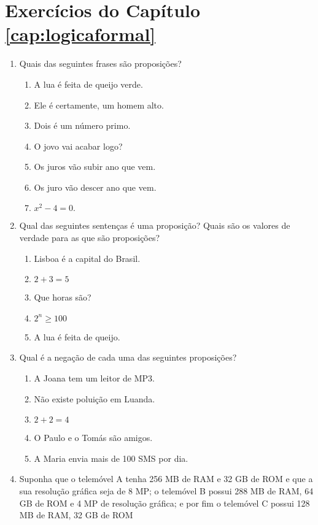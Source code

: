 \chapter*{Exercícios do Capítulo \ref{cap:logicaformal}}

\begin{enumerate}
  	\item Quais das seguintes frases são proposições?
  	\begin{enumerate}
	  	\item A lua é feita de queijo verde.
	  	\item Ele é certamente, um homem alto.
	  	\item Dois é um número primo.
	  	\item O jovo vai acabar logo?
	  	\item Os juros vão subir ano que vem.
	  	\item Os juro vão descer ano que vem.
	  	\item $x^2 - 4 = 0.$
  	\end{enumerate}
  	\item Qual das seguintes sentenças é uma proposição? Quais são os valores de verdade para as que são proposições?
  	\begin{enumerate}
	  	  \item Lisboa é a capital do Brasil.
	  	  \item $2 + 3 = 5$
	  	  \item Que horas são?
	  	  \item $2^n \geq 100$
	  	  \item A lua é feita de queijo.
    \end{enumerate} 
    \item Qual é a negação de cada uma das seguintes proposições?
    \begin{enumerate}
	     \item A Joana tem um leitor de MP3.
	     \item Não existe poluição em Luanda.
	     \item $2 + 2 = 4$
	     \item O Paulo e o Tomás são amigos.
	     \item A Maria envia mais de 100 SMS por dia.
  	\end{enumerate}
  	\item Suponha que o telemóvel A tenha 256 MB de RAM e 32 GB de ROM e que a sua resolução gráfica seja de 8 MP; o telemóvel
  	B possui 288 MB de RAM, 64 GB de ROM e 4 MP de resolução gráfica; e por fim o telemóvel C possui 128 MB de RAM, 32 GB de ROM

\end{enumerate}
